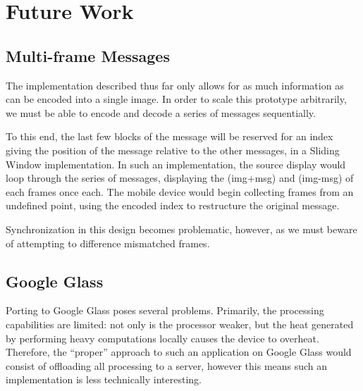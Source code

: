\documentclass[11pt, letterpaper]{article}
\begin{document}
\section{Future Work}

\subsection{Multi-frame Messages}
The implementation described thus far only allows for as much information as can be encoded into a single image.
In order to scale this prototype arbitrarily, we must be able to encode and decode a series of messages sequentially.

To this end, the last few blocks of the message will be reserved for an index giving the position of the message relative to the other messages, in a Sliding Window implementation.
In such an implementation, the source display would loop through the series of messages, displaying the (img+msg) and (img-msg) of each frames once each.
The mobile device would begin collecting frames from an undefined point, using the encoded index to restructure the original message.

Synchronization in this design becomes problematic, however, as we must beware of attempting to difference mismatched frames.

\subsection{Google Glass}
Porting to Google Glass poses several problems. Primarily, the processing capabilities are limited: not only is the processor weaker, but the heat generated by performing heavy computations locally causes the device to overheat.
Therefore, the ``proper'' approach to such an application on Google Glass would consist of offloading all processing to a server, however this means such an implementation is less technically interesting.

\printbibliography
\end{document}
